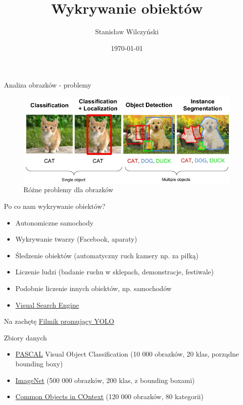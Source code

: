 \documentclass[11pt]{beamer}
\author{Stanisław Wilczyński}
\title{Wykrywanie obiektów}
\institute{Uniwersytet Wrocławski}
\date{\today}
\begin{document}
\begin{frame}
\titlepage
\end{frame}

\begin{frame}{Analiza obrazków - problemy}
\begin{figure}
    \centering
    \includegraphics[width=\textwidth]{grafika/problemy.jpeg}
    \caption{Różne problemy dla obrazków}
    \label{fig_problemy}
\end{figure}
\end{frame}

\begin{frame}{Po co nam wykrywanie obiektów?}
\begin{itemize}
    \item Autonomiczne samochody
    \item Wykrywanie twarzy (Facebook, aparaty)
    \item Śledzenie obiektów (automatyczny ruch kamery np. za piłką)
    \item Liczenie ludzi (badanie ruchu w sklepach, demonstracje, festiwale)
    \item Podobnie liczenie innych obiektów, np. samochodów
    \item \href{https://tryolabs.com/blog/2017/08/30/object-detection-an-overview-in-the-age-of-deep-learning/}{Visual Search Engine}
\end{itemize}

\begin{block}{Na zachętę}
    \href{https://www.youtube.com/watch?v=VOC3huqHrss&t}{Filmik promujący YOLO}
\end{block}
\end{frame}

\begin{frame}{Zbiory danych}

\begin{itemize}
    \item \href{http://host.robots.ox.ac.uk/pascal/VOC/voc2011/examples/index.html}{PASCAL} Visual Object Classification (10 000 obrazków, 20 klas, porządne bounding boxy)
    \item \href{https://www.kaggle.com/c/imagenet-object-detection-challenge}{ImageNet} (500 000 obrazków, 200 klas, z bounding boxami)
    \item \href{http://cocodataset.org/\#explore}{Common Objects in COntext} (120 000 obrazków, 80 kategorii)
\end{itemize}
\end{frame}
\end{document}
